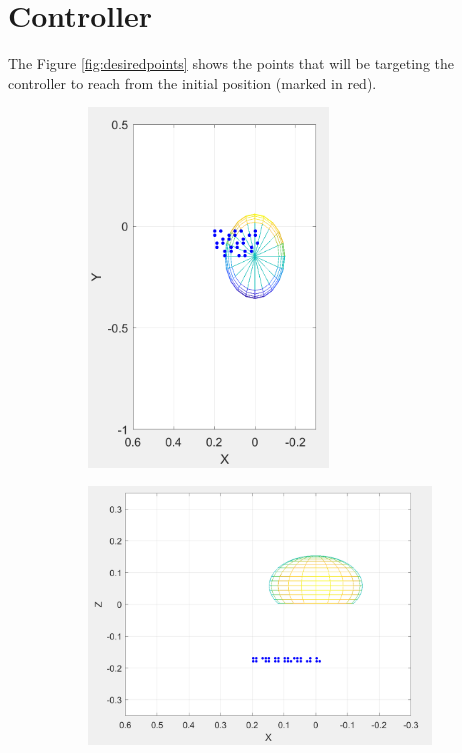 \section{Controller}

The Figure \ref{fig:desiredpoints} shows the points that will be targeting the controller to reach from the initial position (marked in red). 

\begin{figure}[h!] 
    \centering
    \begin{subfigure}[b]{0.45\linewidth}
        \includegraphics[width=0.7\textwidth]{Pictures/Results/Controller/DesiredPointsFV.png}
    \end{subfigure}
    \hfill
    \begin{subfigure}[b]{0.45\linewidth}            
        \includegraphics[width=\textwidth]{Pictures/Results/Controller/DesiredPointsSV.png}

\end{subfigure}
\end{figure}
